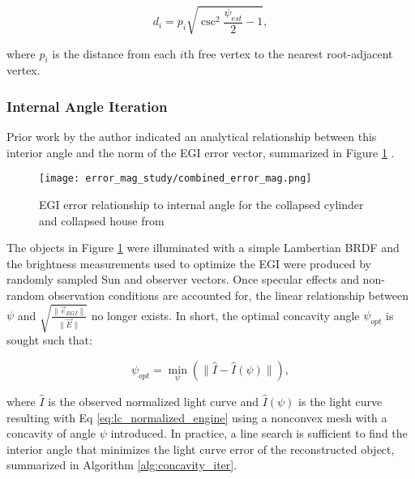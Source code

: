 \begin{equation} \label{eq:flip_depth}
  d_i = p_i \sqrt{\csc^2 \frac{\psi_{est}}{2} - 1},
\end{equation}

where $p_i$ is the distance from each $i$th free vertex to the nearest root-adjacent vertex.

\subsubsection{Internal Angle Iteration}

Prior work by the author indicated an analytical relationship between this interior angle and the norm of the EGI error vector, summarized in Figure \ref{fig:misleading_egi_error} \cite{robinson2022}.

\begin{figure}[!htb]
  \centering
  \texttt{[image: error\_mag\_study/combined\_error\_mag.png]}
  \caption{EGI error relationship to internal angle for the collapsed cylinder and collapsed house from \cite{robinson2022}}
  \label{fig:misleading_egi_error}
\end{figure}

The objects in Figure \ref{fig:misleading_egi_error} were illuminated with a simple Lambertian BRDF and the brightness measurements used to optimize the EGI were produced by randomly sampled Sun and observer vectors. Once specular effects and non-random observation conditions are accounted for, the linear relationship between $\psi$ and $\sqrt{\frac{\|\vec{e}_{EGI}\|}{\|\vec{E}\|}}$ no longer exists. In short, the optimal concavity angle $\psi_{opt}$ is sought such that:

\begin{equation}
  \psi_{opt} = \min_{\psi} \left( \| \hat{I} - \hat{I}(\psi) \| \right),
\end{equation}

where $\hat{I}$ is the observed normalized light curve and $\hat{I}(\psi)$ is the light curve resulting with Eq \ref{eq:lc_normalized_engine} using a nonconvex mesh with a concavity of angle $\psi$ introduced. In practice, a line search is sufficient to find the interior angle that minimizes the light curve error of the reconstructed object, summarized in Algorithm \ref{alg:concavity_iter}.

